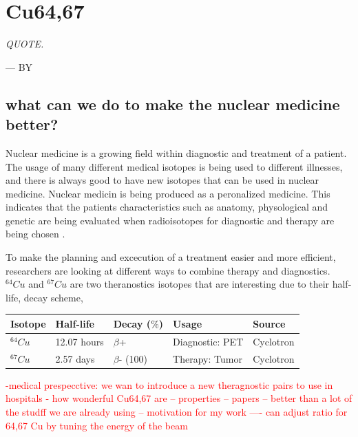 \documentclass[twoside,english]{uiofysmaster/uiofysmaster}
\begin{document}

\chapter{Cu64,67} 
\label{ch: mywork}

\epigraph{\itshape QUOTE.}{--- \textup{BY}}


\section{what can we do to make the nuclear medicine better?}
\label{sec: betterwork}

Nuclear medicine is a growing field within diagnostic and treatment of a patient. The usage of many different medical isotopes is being used to different illnesses, and there is always good to have new isotopes that can be used in nuclear medicine.
Nuclear medicin is being produced as a peronalized medicine. This indicates that the patients characteristics such as anatomy, physological and genetic are being evaluated when radioisotopes for diagnostic and therapy are being chosen \cite{Ahmedova2018}. 


To make the planning and excecution of a treatment easier and more efficient, researchers are looking at different ways to combine therapy and diagnostics. 
$^{64}Cu$ and $^{67}Cu$ are two theranostics isotopes that are interesting due to their half-life, decay scheme, 


 \begin{tabular}{  p{3cm} p{3cm} p{3cm} p{3cm} p{3cm}   }
 \hline
Isotope  & Half-life & Decay ($\%$) & Usage & Source \\
 \hline
 $^{64}Cu$ &  12.07 hours & $\beta$+ & Diagnostic: PET & Cyclotron \\
 $^{67}Cu$ &  2.57 days & $\beta$- (100) & Therapy: Tumor & Cyclotron\\ 
 \hline
\end{tabular}


\textcolor{red}{-medical prespecctive: we wan to introduce a new theragnostic pairs to use in hospitals
- how wonderful Cu64,67 are
-- properties
-- papers
-- better than a lot of the studff we are already using
-- motivation for my work
---- can adjust ratio for 64,67 Cu by tuning the energy of the beam}
\end{document}
